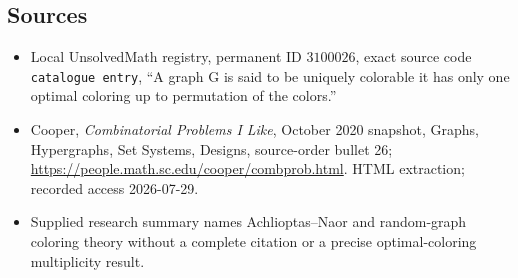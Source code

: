 \documentclass[11pt]{article}
\begin{document}
\subsection{Sources}
\begin{itemize}
\item Local UnsolvedMath registry, permanent ID \(3100026\), exact source code \texttt{catalogue entry}, ``A graph G is said to be uniquely colorable it has only one optimal coloring up to permutation of the colors.''
\item Cooper, \emph{Combinatorial Problems I Like}, October 2020 snapshot, Graphs, Hypergraphs, Set Systems, Designs, source-order bullet 26; \url{https://people.math.sc.edu/cooper/combprob.html}. HTML extraction; recorded access 2026-07-29.
\item Supplied research summary names Achlioptas--Naor and random-graph coloring theory without a complete citation or a precise optimal-coloring multiplicity result.
\end{itemize}
\end{document}

